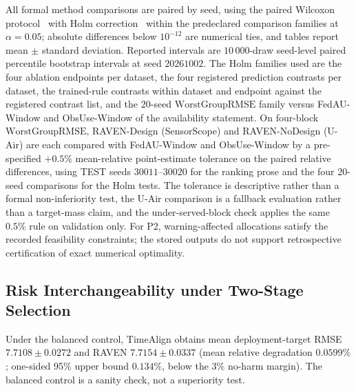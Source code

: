 \documentclass[letterpaper,journal]{IEEEtran}
\begin{document}
All formal method comparisons are paired by seed, using the paired Wilcoxon
protocol~\cite{wilcoxon1945individual} with Holm
correction~\cite{holm1979simple} within the predeclared comparison families at
$\alpha=0.05$; absolute differences below $10^{-12}$ are numerical ties, and
tables report mean $\pm$ standard deviation.  Reported intervals are
$10\,000$-draw seed-level paired percentile bootstrap intervals at seed
$20261002$.  The Holm families used are the four ablation endpoints per dataset,
the four registered prediction contrasts per dataset, the trained-rule contrasts
within dataset and endpoint against the registered contrast list, and the
$20$-seed $\mathrm{WorstGroupRMSE}$ family versus FedAU-Window and ObsUse-Window
of the availability statement.  On four-block
$\mathrm{WorstGroupRMSE}$, RAVEN-Design (SensorScope) and RAVEN-NoDesign (U-Air)
are each compared with FedAU-Window and ObsUse-Window by a pre-specified $+0.5\%$
mean-relative point-estimate tolerance on the paired relative differences, using
TEST seeds $30011$--$30020$ for the ranking prose and the four 20-seed
comparisons for the Holm tests.  The tolerance is descriptive rather than a
formal non-inferiority test, the U-Air comparison is a fallback evaluation rather
than a target-mass claim, and the under-served-block check applies the same
$0.5\%$ rule on validation only.  For P2, warning-affected allocations satisfy
the recorded feasibility constraints; the stored outputs do not support
retrospective certification of exact numerical optimality.

\subsection{Risk Interchangeability under Two-Stage Selection}
\label{subsec:eval_rq1}

Under the balanced control, TimeAlign obtains mean deployment-target
RMSE $7.7108\pm0.0272$ and RAVEN $7.7154\pm0.0337$ (mean relative
degradation $0.0599\%$; one-sided 95\% upper bound $0.134\%$, below the
3\% no-harm margin).  The balanced control is a sanity check, not a superiority
test.
\end{document}
